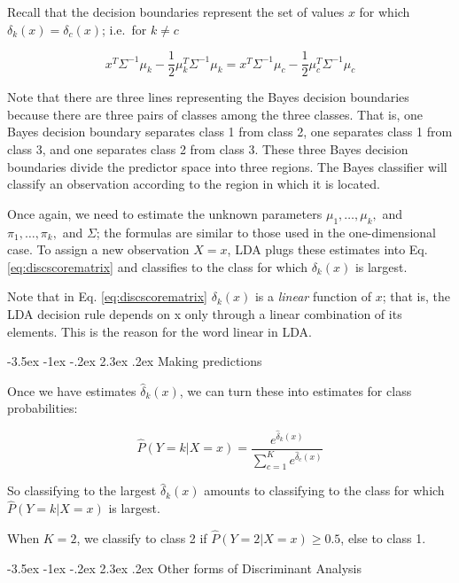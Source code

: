 \documentclass[]{book}
\makeatletter
\renewcommand\section{\@startsection {section}{1}{\z@}%
                                   {-3.5ex \@plus -1ex \@minus -.2ex}%
                                   {2.3ex \@plus.2ex}%
                                   {\normalfont\Large\bfseries\color{ForestGreen}}}
\theoremstyle{definition}
\theoremstyle{definition}
\theoremstyle{definition}
\theoremstyle{remark}
\makeatother
\begin{document}
Recall that the decision boundaries represent the set of values \(x\)
for which \(\delta_k(x)=\delta_c(x)\); i.e.~for \(k\neq c\)

\[ x^T \Sigma^{-1} \mu_k - \frac{1}{2} \mu_k^T \Sigma^{-1}  \mu_k = x^T \Sigma^{-1} \mu_c - \frac{1}{2} \mu_c^T \Sigma^{-1}  \mu_c  \]

Note that there are three lines representing the Bayes decision
boundaries because there are three pairs of classes among the three
classes. That is, one Bayes decision boundary separates class 1 from
class 2, one separates class 1 from class 3, and one separates class 2
from class 3. These three Bayes decision boundaries divide the predictor
space into three regions. The Bayes classiﬁer will classify an
observation according to the region in which it is located.

Once again, we need to estimate the unknown parameters
\(\mu_1,\ldots,\mu_k,\) and \(\pi_1,\ldots,\pi_k,\) and \(\Sigma\); the
formulas are similar to those used in the one-dimensional case. To
assign a new observation \(X = x\), LDA plugs these estimates into Eq.
\eqref{eq:discscorematrix} and classiﬁes to the class for which
\(\delta_k(x)\) is largest.

Note that in Eq. \eqref{eq:discscorematrix} \(\delta_k(x)\) is a
\emph{linear} function of \(x\); that is, the LDA decision rule depends
on x only through a linear combination of its elements. This is the
reason for the word linear in LDA.

\section{Making predictions}\label{making-predictions}

Once we have estimates \(\hat{\delta}_k(x)\), we can turn these into
estimates for class probabilities:

\[ \hat{P}(Y=k|X=x)= \frac{e^{\hat{\delta}_k(x)}}{\sum_{c=1}^K e^{\hat{\delta}_c(x)}} \]

So classifying to the largest \(\hat{\delta}_k(x)\) amounts to
classifying to the class for which \(\hat{P}(Y=k|X=x)\) is largest.

When \(K=2\), we classify to class 2 if \(\hat{P}(Y=2|X=x) \geq 0.5\),
else to class 1.

\section{Other forms of Discriminant
Analysis}\label{other-forms-of-discriminant-analysis}
\end{document}
